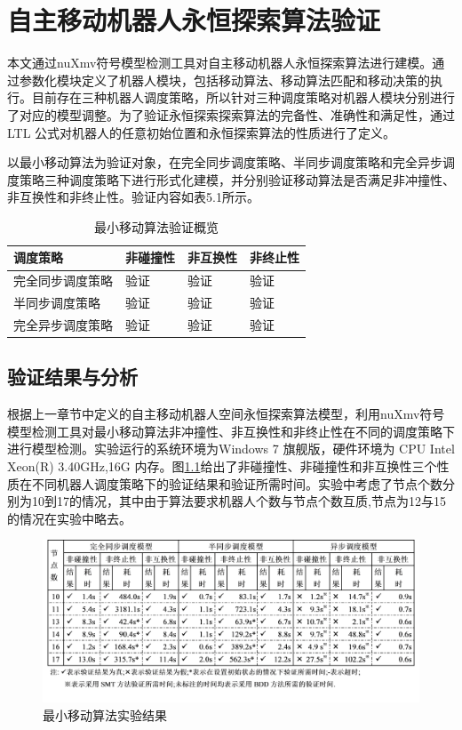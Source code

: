\chapter{自主移动机器人永恒探索算法验证}
本文通过nuXmv符号模型检测工具对自主移动机器人永恒探索算法进行建模。通过参数化模块定义了机器人模块，包括移动算法、移动算法匹配和移动决策的执行。目前存在三种机器人调度策略，所以针对三种调度策略对机器人模块分别进行了对应的模型调整。为了验证永恒探索探索算法的完备性、准确性和满足性，通过LTL 公式对机器人的任意初始位置和永恒探索算法的性质进行了定义。

以最小移动算法为验证对象，在完全同步调度策略、半同步调度策略和完全异步调度策略三种调度策略下进行形式化建模，并分别验证移动算法是否满足非冲撞性、非互换性和非终止性。验证内容如表5.1所示。

\begin{table}[hbt]
	\centering
	\caption{最小移动算法验证概览}
	\begin{tabular}{|p{4cm}|p{2cm}|p{2cm}|p{2cm}|}
		\hline
		\bf{调度策略}&\bf{非碰撞性}&\bf{非互换性}&\bfseries{非终止性} \\
		\hline
		完全同步调度策略&验证&验证&验证 \\
		\hline
		半同步调度策略&验证&验证&验证 \\
		\hline
		完全异步调度策略&验证&验证&验证 \\
		\hline
	\end{tabular}
	\label{table:tableminChecker}
\end{table}

\section{验证结果与分析}
根据上一章节中定义的自主移动机器人空间永恒探索算法模型，利用nuXmv符号模型检测工具对最小移动算法非冲撞性、非互换性和非终止性在不同的调度策略下进行模型检测。实验运行的系统环境为Windows 7 旗舰版，硬件环境为 CPU Intel Xeon(R) 3.40GHz,16G 内存。图\ref{fig:check_result}给出了非碰撞性、非碰撞性和非互换性三个性质在不同机器人调度策略下的验证结果和验证所需时间。实验中考虑了节点个数分别为10到17的情况，其中由于算法要求机器人个数与节点个数互质,节点为12与15的情况在实验中略去。

\begin{figure}[!hbt]
	\centering
	\includegraphics[width=6 in]{fig/check_result.png}
	\caption{最小移动算法实验结果}
	\label{fig:check_result}
\end{figure}

